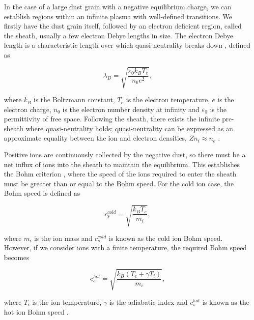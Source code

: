\documentclass{article}
\begin{document}
In the case of a large dust grain with a negative equilibrium charge, we can establish regions within an infinite plasma with well-defined
transitions. We firstly have the dust grain itself, followed
by an electron deficient region, called the sheath, usually a few electron Debye lengths
in size. The electron Debye length is a characteristic length over which quasi-neutrality breaks down \cite{DebyeLength} \cite{IntroToPlasmas}, 
defined as

\begin{equation}\label{eq:Debye}
\lambda_D = \sqrt{\frac{\varepsilon_{0} k_{B} T_{e}}{n_{0} e^2}},
\end{equation}

\medskip

\noindent where $k_B$ is the Boltzmann constant, $T_e$ is the electron temperature, $e$ is the 
electron charge, $n_0$ is the electron number density at infinity and $\varepsilon_{0}$ is the
permittivity of free space. Following the sheath, there exists the infinite pre-sheath where quasi-neutrality holds;
quasi-neutrality can be expressed as an approximate equality between the ion and electron
densities, $Zn_i \approx n_e$ \cite{IntroToPlasmas}.

\medskip

Positive ions are continuously collected by the negative dust, so there must be
a net influx of ions into the sheath to maintain the equilibrium. This establishes the Bohm
criterion \cite{Bohm}, where the speed of the ions required to enter the sheath must be 
greater than or equal to the Bohm speed. For the cold ion case, the Bohm speed is defined as

\smallskip 

\begin{equation}\label{eq:ColdBohm}
c_{s}^{cold} = \sqrt{\frac{k_{B}T_{e}}{m_{i}}},
\end{equation}

\noindent where $m_i$ is the ion mass and $c_{s}^{cold}$ is known as the cold ion Bohm speed. 
However, if we consider ions with a finite temperature, the required Bohm speed becomes 

\begin{equation}\label{eq:HotBohm}
c_{s}^{hot} = \sqrt{\frac{k_{B}(T_{e} + \gamma T_{i})}{m_{i}}},
\end{equation}

\smallskip

\noindent where $T_i$ is the ion temperature, $\gamma$ is the adiabatic index
and $c_{s}^{hot}$ is known as the hot ion Bohm speed \cite{Stangeby1986} \cite{Willis} .
\end{document}
